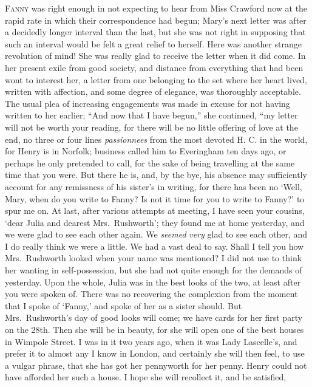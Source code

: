 \documentclass{article}
\newcommand{\gintro}[1]{\textcolor{gcolor}{\textsc{#1}}}
\begin{document}
\gintro{Fanny} was right enough in not expecting to hear from Miss
Crawford now at the rapid rate in which their correspondence
had begun; Mary's next letter was after a decidedly longer
interval than the last, but she was not right in supposing
that such an interval would be felt a great relief
to herself.  Here was another strange revolution of mind!
She was really glad to receive the letter when it did come.
In her present exile from good society, and distance from
everything that had been wont to interest her, a letter
from one belonging to the set where her heart lived,
written with affection, and some degree of elegance,
was thoroughly acceptable.  The usual plea of increasing
engagements was made in excuse for not having
written to her earlier; ``And now that I have begun,''
she continued, ``my letter will not be worth your reading,
for there will be no little offering of love at the end,
no three or four lines \emph{passionnees} from the most
devoted H. C. in the world, for Henry is in Norfolk;
business called him to Everingham ten days ago,
or perhaps he only pretended to call, for the sake of being
travelling at the same time that you were.  But there
he is, and, by the bye, his absence may sufficiently account
for any remissness of his sister's in writing, for there
has been no `Well, Mary, when do you write to Fanny?
Is not it time for you to write to Fanny?' to spur me on.
At last, after various attempts at meeting, I have seen
your cousins, `dear Julia and dearest Mrs.\ Rushworth';
they found me at home yesterday, and we were glad to
see each other again.  We \emph{seemed} \emph{very} glad to see
each other, and I do really think we were a little.
We had a vast deal to say.  Shall I tell you how
Mrs.\ Rushworth looked when your name was mentioned?
I did not use to think her wanting in self-possession,
but she had not quite enough for the demands of yesterday.
Upon the whole, Julia was in the best looks of the two,
at least after you were spoken of.  There was no
recovering the complexion from the moment that I spoke
of `Fanny,' and spoke of her as a sister should.
But Mrs.\ Rushworth's day of good looks will come;
we have cards for her first party on the 28th.  Then she
will be in beauty, for she will open one of the best
houses in Wimpole Street.  I was in it two years ago,
when it was Lady Lascelle's, and prefer it to almost
any I know in London, and certainly she will then feel,
to use a vulgar phrase, that she has got her pennyworth
for her penny.  Henry could not have afforded her such
a house.  I hope she will recollect it, and be satisfied,
\end{document}
